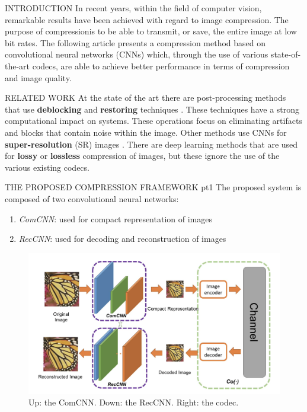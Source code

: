 \documentclass[10pt]{beamer}
\begin{document}
\begin{frame}{INTRODUCTION}
    In recent years, within the field of computer vision, remarkable results 
    have been achieved with regard to image compression. The purpose of 
    compressionis to be able to transmit, or save, the entire image at low bit 
    rates. The following article presents a compression method based on 
    convolutional neural networks (CNNs) which, through the use of various 
    state-of-the-art codecs, are able to achieve better performance in terms 
    of compression and image quality.
\end{frame}

\begin{frame}{RELATED WORK}
    At the state of the art there are post-processing methods that use 
    {\bfseries{deblocking}} and {\bfseries{restoring}} techniques . These techniques have a strong 
    computational impact on systems. These operations focus on eliminating 
    artifacts and blocks that contain noise within the image. Other methods 
    use CNNs for {\bfseries{super-resolution}} (SR) images . There are deep learning 
    methods that are used for {\bfseries{lossy}}  or {\bfseries{lossless}}  compression of images, but 
    these ignore the use of the various existing codecs.
\end{frame}

\begin{frame}{THE PROPOSED COMPRESSION FRAMEWORK pt1}
    The proposed system is composed of two convolutional neural networks:
    \begin{enumerate}
        \item \emph{ComCNN}: used for compact representation of images
        \item \emph{RecCNN}: used for decoding and reconstruction of images
    \end{enumerate}
    \begin{figure}[htbp]
        \centering
        \includegraphics[width = 0.8 \linewidth]{images/paper3/framework.png}
        \centering
        \caption{Up: the ComCNN. Down: the RecCNN. Right: the codec.}
        \label{fig: framework}
    \end{figure}
\end{frame}
\end{document}
